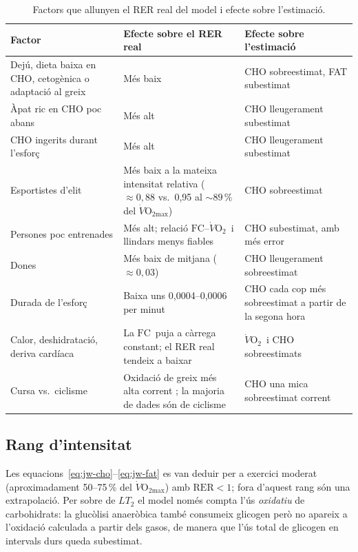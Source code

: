 \documentclass[10pt,a4paper]{article}
\newcommand{\VO}{\ensuremath{\dot V\mathrm{O_2}}}
\newcommand{\VOmax}{\ensuremath{\dot V\mathrm{O_{2max}}}}
\newcommand{\RER}{\ensuremath{\mathrm{RER}}}
\newcommand{\FC}{\ensuremath{\mathrm{FC}}}
\begin{document}
\begin{table}[htbp]
\centering
\caption{Factors que allunyen el RER real del model i efecte sobre l'estimació.}
\label{tab:factors}
\small
\begin{tabularx}{\textwidth}{@{}>{\raggedright\arraybackslash}p{3.6cm} L >{\raggedright\arraybackslash}p{3.4cm}@{}}
\toprule
Factor & Efecte sobre el RER real & Efecte sobre l'estimació \\
\midrule
Dejú, dieta baixa en CHO, cetogènica o adaptació al greix &
Més baix \citep{bergman1999,achten2003cho} & CHO sobreestimat, FAT subestimat \\
Àpat ric en CHO poc abans & Més alt & CHO lleugerament subestimat \\
CHO ingerits durant l'esforç & Més alt & CHO lleugerament subestimat \\
Esportistes d'elit & Més baix a la mateixa intensitat relativa ($\approx0{,}88$
vs.\ 0,95 al $\sim89\,\%$ del \VOmax) \citep{hetlelid2015} & CHO sobreestimat \\
Persones poc entrenades & Més alt; relació \FC--\VO\ i llindars menys fiables &
CHO subestimat, amb més error \\
Dones & Més baix de mitjana ($\approx0{,}03$)
\citep{rothschild2022,venables2005} & CHO lleugerament sobreestimat \\
Durada de l'esforç & Baixa uns 0,0004--0,0006 per minut \citep{rothschild2022} &
CHO cada cop més sobreestimat a partir de la segona hora \\
Calor, deshidratació, deriva cardíaca & La \FC\ puja a càrrega constant; el RER real
tendeix a baixar & \VO\ i CHO sobreestimats \\
Cursa vs.\ ciclisme & Oxidació de greix més alta corrent \citep{achten2003run}; la
majoria de dades són de ciclisme & CHO una mica sobreestimat corrent \\
\bottomrule
\end{tabularx}
\end{table}

\subsection{Rang d'intensitat}
Les equacions~\eqref{eq:jw-cho}--\eqref{eq:jw-fat} es van deduir per a exercici
moderat (aproximadament 50--75\,\% del \VOmax) amb $\RER<1$; fora d'aquest rang són
una extrapolació. Per sobre de $LT_2$ el model només compta l'ús \emph{oxidatiu} de
carbohidrats: la glucòlisi anaeròbica també consumeix glicogen però no apareix a
l'oxidació calculada a partir dels gasos, de manera que l'ús total de glicogen en
intervals durs queda subestimat.
\end{document}
